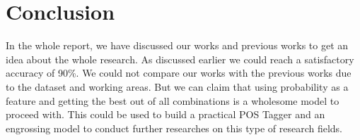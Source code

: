 \documentclass{standalone}
\begin{document}
\chapter{Conclusion}
In the whole report, we have discussed our works and previous works to get an idea about the whole research. As discussed earlier we could reach a satisfactory accuracy of  90\%. We could not compare our works with the previous works due to the dataset and working areas. But we can claim that using probability as a feature and getting the best out of all combinations is a wholesome model to proceed with. This could be used to build a practical POS Tagger and an engrossing model to conduct further researches on this type of research fields.
\end{document}
